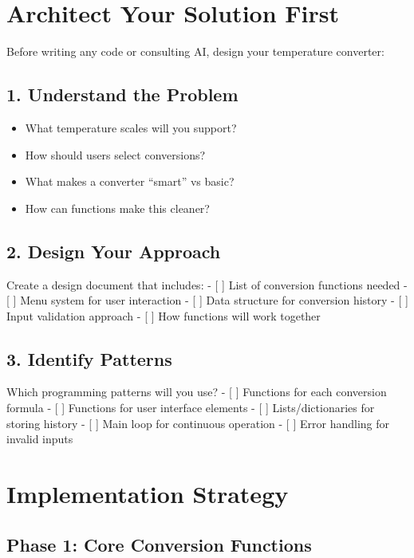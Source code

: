 \documentclass[
  letterpaper,
  DIV=11,
  numbers=noendperiod,
  oneside]{scrreprt}
\providecommand{\tightlist}{%
  \setlength{\itemsep}{0pt}\setlength{\parskip}{0pt}}\usepackage{longtable,booktabs,array}
\begin{document}
\section{Architect Your Solution
First}\label{architect-your-solution-first-4}

Before writing any code or consulting AI, design your temperature
converter:

\subsection{1. Understand the Problem}\label{understand-the-problem-4}

\begin{itemize}
\tightlist
\item
  What temperature scales will you support?
\item
  How should users select conversions?
\item
  What makes a converter ``smart'' vs basic?
\item
  How can functions make this cleaner?
\end{itemize}

\subsection{2. Design Your Approach}\label{design-your-approach-4}

Create a design document that includes: - {[} {]} List of conversion
functions needed - {[} {]} Menu system for user interaction - {[} {]}
Data structure for conversion history - {[} {]} Input validation
approach - {[} {]} How functions will work together

\subsection{3. Identify Patterns}\label{identify-patterns-4}

Which programming patterns will you use? - {[} {]} Functions for each
conversion formula - {[} {]} Functions for user interface elements - {[}
{]} Lists/dictionaries for storing history - {[} {]} Main loop for
continuous operation - {[} {]} Error handling for invalid inputs

\section{Implementation Strategy}\label{implementation-strategy-4}

\subsection{Phase 1: Core Conversion
Functions}\label{phase-1-core-conversion-functions}
\end{document}
